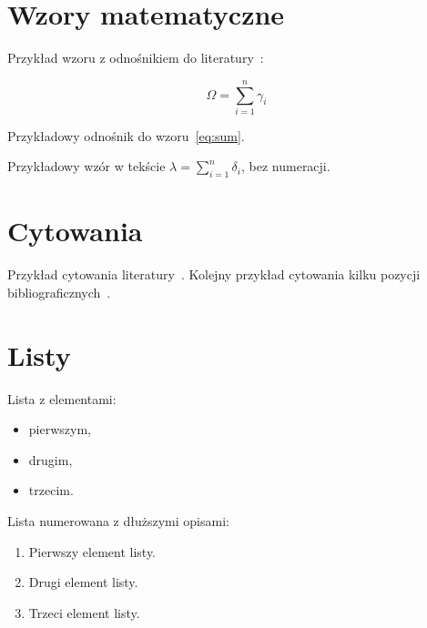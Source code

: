 \documentclass[polish]{aghengthesis}
\begin{document}
\section{Wzory matematyczne}
\label{sec:wzory}


Przykład wzoru z odnośnikiem do literatury~\cite{author2021title}:

\begin{equation}
\Omega = \sum_{i=1}^n \gamma_i
\label{eq:sum}
\end{equation}

Przykładowy odnośnik do wzoru~\eqref{eq:sum}.

Przykładowy wzór w tekście $\lambda = \sum_{i=1}^n \delta_i$, bez numeracji.

\section{Cytowania}
\label{sec:cytowania}

Przykład cytowania literatury~\cite{wilson2009prediction-interday}. Kolejny przykład
cytowania kilku pozycji bibliograficznych~\cite{allen1999using-genetic, zitzler1999evolutionary-algorithms, pictet1995genetic-algorithms, wilhelmstotter2021jenetics, chmaj2015DistributedProcessingApplications}.
\section{Listy}
\label{sec:listy}

Lista z elementami:
\begin{itemize}
\item pierwszym,
\item drugim,
\item trzecim.
\end{itemize}

Lista numerowana z dłuższymi opisami:
\begin{enumerate}
\item Pierwszy element listy.
\item Drugi element listy.
\item Trzeci element listy.
\end{enumerate}
\end{document}
